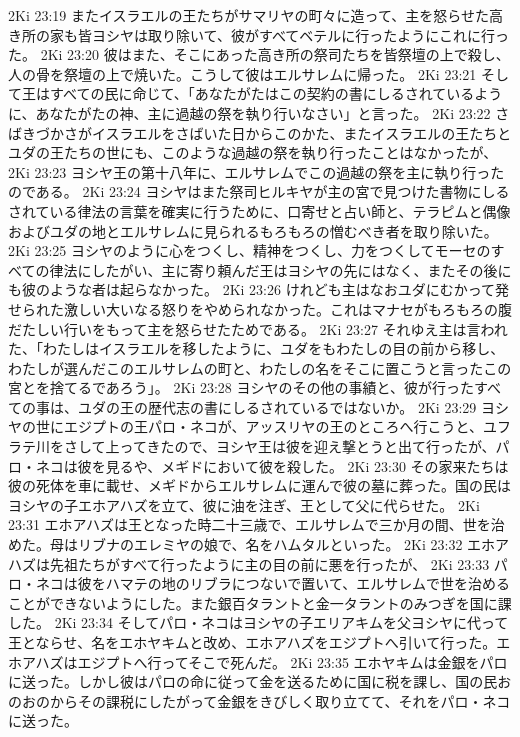 2Ki 23:19  またイスラエルの王たちがサマリヤの町々に造って、主を怒らせた高き所の家も皆ヨシヤは取り除いて、彼がすべてベテルに行ったようにこれに行った。
2Ki 23:20  彼はまた、そこにあった高き所の祭司たちを皆祭壇の上で殺し、人の骨を祭壇の上で焼いた。こうして彼はエルサレムに帰った。
2Ki 23:21  そして王はすべての民に命じて、「あなたがたはこの契約の書にしるされているように、あなたがたの神、主に過越の祭を執り行いなさい」と言った。
2Ki 23:22  さばきづかさがイスラエルをさばいた日からこのかた、またイスラエルの王たちとユダの王たちの世にも、このような過越の祭を執り行ったことはなかったが、
2Ki 23:23  ヨシヤ王の第十八年に、エルサレムでこの過越の祭を主に執り行ったのである。
2Ki 23:24  ヨシヤはまた祭司ヒルキヤが主の宮で見つけた書物にしるされている律法の言葉を確実に行うために、口寄せと占い師と、テラピムと偶像およびユダの地とエルサレムに見られるもろもろの憎むべき者を取り除いた。
2Ki 23:25  ヨシヤのように心をつくし、精神をつくし、力をつくしてモーセのすべての律法にしたがい、主に寄り頼んだ王はヨシヤの先にはなく、またその後にも彼のような者は起らなかった。
2Ki 23:26  けれども主はなおユダにむかって発せられた激しい大いなる怒りをやめられなかった。これはマナセがもろもろの腹だたしい行いをもって主を怒らせたためである。
2Ki 23:27  それゆえ主は言われた、「わたしはイスラエルを移したように、ユダをもわたしの目の前から移し、わたしが選んだこのエルサレムの町と、わたしの名をそこに置こうと言ったこの宮とを捨てるであろう」。
2Ki 23:28  ヨシヤのその他の事績と、彼が行ったすべての事は、ユダの王の歴代志の書にしるされているではないか。
2Ki 23:29  ヨシヤの世にエジプトの王パロ・ネコが、アッスリヤの王のところへ行こうと、ユフラテ川をさして上ってきたので、ヨシヤ王は彼を迎え撃とうと出て行ったが、パロ・ネコは彼を見るや、メギドにおいて彼を殺した。
2Ki 23:30  その家来たちは彼の死体を車に載せ、メギドからエルサレムに運んで彼の墓に葬った。国の民はヨシヤの子エホアハズを立て、彼に油を注ぎ、王として父に代らせた。
2Ki 23:31  エホアハズは王となった時二十三歳で、エルサレムで三か月の間、世を治めた。母はリブナのエレミヤの娘で、名をハムタルといった。
2Ki 23:32  エホアハズは先祖たちがすべて行ったように主の目の前に悪を行ったが、
2Ki 23:33  パロ・ネコは彼をハマテの地のリブラにつないで置いて、エルサレムで世を治めることができないようにした。また銀百タラントと金一タラントのみつぎを国に課した。
2Ki 23:34  そしてパロ・ネコはヨシヤの子エリアキムを父ヨシヤに代って王とならせ、名をエホヤキムと改め、エホアハズをエジプトへ引いて行った。エホアハズはエジプトへ行ってそこで死んだ。
2Ki 23:35  エホヤキムは金銀をパロに送った。しかし彼はパロの命に従って金を送るために国に税を課し、国の民おのおのからその課税にしたがって金銀をきびしく取り立てて、それをパロ・ネコに送った。
